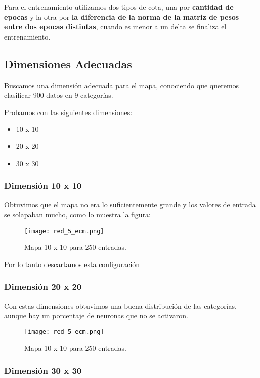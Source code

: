 Para el entrenamiento utilizamos dos tipos de cota, una por \textbf{cantidad
de epocas} y la otra por \textbf{la diferencia de la norma de la matriz de pesos
entre dos epocas distintas}, cuando es menor a un delta se finaliza 
el entrenamiento.


\subsection{Dimensiones Adecuadas}

Buscamos una dimensión adecuada para el mapa, conociendo que queremos
clasificar 900 datos en 9 categorías.

Probamos con las siguientes dimensiones:

\begin{itemize}
	\item 10 x 10
	\item 20 x 20
	\item 30 x 30
\end{itemize}

\subsubsection{Dimensión 10 x 10 }

Obtuvimos que el mapa no era lo suficientemente grande y los valores de
entrada se solapaban mucho, como lo muestra la figura:

\begin{figure}[H]
  \centering
  \texttt{[image: red\_5\_ecm.png]}
  \caption{Mapa 10 x 10 para 250 entradas.}
  \label{fig:mapa 10 10 250}
\end{figure}


Por lo tanto descartamos esta configuración

\subsubsection{Dimensión 20 x 20 }

Con estas dimensiones obtuvimos una buena distribución de las categorías,
aunque hay un porcentaje de neuronas que no se activaron.

\begin{figure}[H]
  \centering
  \texttt{[image: red\_5\_ecm.png]}
  \caption{Mapa 10 x 10 para 250 entradas.}
  \label{fig:mapa 10 10 250}
\end{figure}


\subsubsection{Dimensión 30 x 30 }

